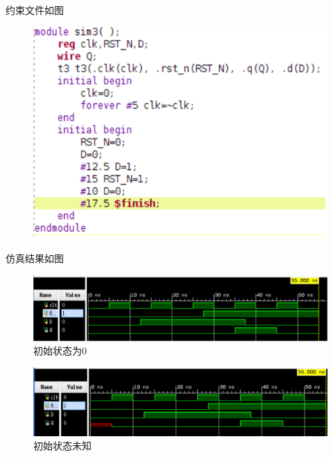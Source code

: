 \documentclass{article}
\begin{document}
    约束文件如图
    \begin{figure}[htbp]
        \centering
        \includegraphics[scale=1.5]{t3s.png}
    \end{figure}

    \clearpage

    仿真结果如图
    \begin{figure}[htbp]
        \centering
        \includegraphics[scale=0.8]{t3r1.png}
        \caption*{初始状态为0}
    \end{figure}

    \begin{figure}[htbp]
        \centering
        \includegraphics[scale=0.8]{t3r2.png}
        \caption*{初始状态未知}
    \end{figure}
	
    
\end{document}
